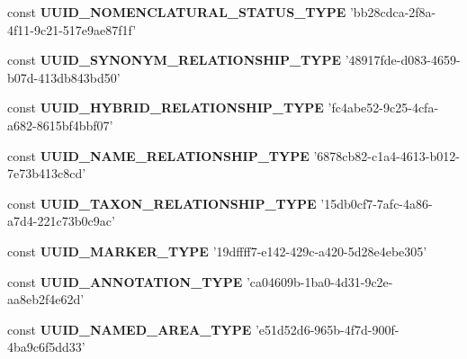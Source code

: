 \begin{DoxyCompactItemize}
\item 
\hypertarget{uuids_8php_a1877dc3a34290415b00fdf8aa94b1cae}{const {\bfseries U\-U\-I\-D\-\_\-\-N\-O\-M\-E\-N\-C\-L\-A\-T\-U\-R\-A\-L\-\_\-\-S\-T\-A\-T\-U\-S\-\_\-\-T\-Y\-P\-E} 'bb28cdca-\/2f8a-\/4f11-\/9c21-\/517e9ae87f1f'}\label{uuids_8php_a1877dc3a34290415b00fdf8aa94b1cae}

\item 
\hypertarget{uuids_8php_a0283c8b4a68c5cc27dadbb33280a94b5}{const {\bfseries U\-U\-I\-D\-\_\-\-S\-Y\-N\-O\-N\-Y\-M\-\_\-\-R\-E\-L\-A\-T\-I\-O\-N\-S\-H\-I\-P\-\_\-\-T\-Y\-P\-E} '48917fde-\/d083-\/4659-\/b07d-\/413db843bd50'}\label{uuids_8php_a0283c8b4a68c5cc27dadbb33280a94b5}

\item 
\hypertarget{uuids_8php_aaea481b2aaf1d2a8913a45e0334d9c3d}{const {\bfseries U\-U\-I\-D\-\_\-\-H\-Y\-B\-R\-I\-D\-\_\-\-R\-E\-L\-A\-T\-I\-O\-N\-S\-H\-I\-P\-\_\-\-T\-Y\-P\-E} 'fc4abe52-\/9c25-\/4cfa-\/a682-\/8615bf4bbf07'}\label{uuids_8php_aaea481b2aaf1d2a8913a45e0334d9c3d}

\item 
\hypertarget{uuids_8php_ac3485be4f9d5a780b7a754a2d17f082d}{const {\bfseries U\-U\-I\-D\-\_\-\-N\-A\-M\-E\-\_\-\-R\-E\-L\-A\-T\-I\-O\-N\-S\-H\-I\-P\-\_\-\-T\-Y\-P\-E} '6878cb82-\/c1a4-\/4613-\/b012-\/7e73b413c8cd'}\label{uuids_8php_ac3485be4f9d5a780b7a754a2d17f082d}

\item 
\hypertarget{uuids_8php_a8c3c76ae0b8527f5e22bb862db5d31a8}{const {\bfseries U\-U\-I\-D\-\_\-\-T\-A\-X\-O\-N\-\_\-\-R\-E\-L\-A\-T\-I\-O\-N\-S\-H\-I\-P\-\_\-\-T\-Y\-P\-E} '15db0cf7-\/7afc-\/4a86-\/a7d4-\/221c73b0c9ac'}\label{uuids_8php_a8c3c76ae0b8527f5e22bb862db5d31a8}

\item 
\hypertarget{uuids_8php_abf9b3a94412a1bac43a8f9ae16e30238}{const {\bfseries U\-U\-I\-D\-\_\-\-M\-A\-R\-K\-E\-R\-\_\-\-T\-Y\-P\-E} '19dffff7-\/e142-\/429c-\/a420-\/5d28e4ebe305'}\label{uuids_8php_abf9b3a94412a1bac43a8f9ae16e30238}

\item 
\hypertarget{uuids_8php_a817475b845a6c110d299b6c6b3967059}{const {\bfseries U\-U\-I\-D\-\_\-\-A\-N\-N\-O\-T\-A\-T\-I\-O\-N\-\_\-\-T\-Y\-P\-E} 'ca04609b-\/1ba0-\/4d31-\/9c2e-\/aa8eb2f4e62d'}\label{uuids_8php_a817475b845a6c110d299b6c6b3967059}

\item 
\hypertarget{uuids_8php_a200a014b048a027cf0f7f7717576f515}{const {\bfseries U\-U\-I\-D\-\_\-\-N\-A\-M\-E\-D\-\_\-\-A\-R\-E\-A\-\_\-\-T\-Y\-P\-E} 'e51d52d6-\/965b-\/4f7d-\/900f-\/4ba9c6f5dd33'}\label{uuids_8php_a200a014b048a027cf0f7f7717576f515}


\end{DoxyCompactItemize}
